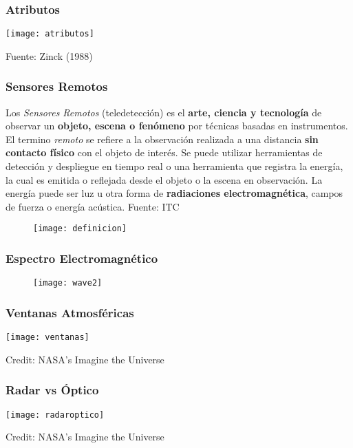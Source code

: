 \documentclass{beamer}
\begin{document}
\begin{frame}
\frametitle{Atributos}
\begin{center}
   	\texttt{[image: atributos]}
\end{center}
\tiny{Fuente: Zinck (1988)}
\end{frame}
\begin{frame}
\frametitle{Sensores Remotos}
\scriptsize {Los \emph{Sensores Remotos} (teledetección) es el \textbf{arte, ciencia y tecnología} de observar un \textbf{objeto, escena o fenómeno} por técnicas basadas en instrumentos. El termino \emph{remoto} se refiere a la observación realizada a una distancia \textbf{sin contacto físico} con el objeto de interés. Se puede utilizar herramientas de detección y despliegue en tiempo real o una herramienta que registra la energía, la cual es emitida o reflejada desde el objeto o la escena en observación. La energía puede ser luz u otra forma de \textbf{radiaciones electromagnética}, campos de fuerza o energía acústica.}
\tiny{Fuente: ITC} 
  \begin{figure}
    \centering
    \texttt{[image: definicion]}
   \end{figure}
\end{frame}
\begin{frame}
\frametitle{Espectro Electromagnético}
  \begin{figure}
    \centering
    \texttt{[image: wave2]}
  \end{figure}
\end{frame}
\begin{frame}
\frametitle{Ventanas Atmosféricas}
\begin{center} 
\texttt{[image: ventanas]}
\end{center}
\tiny{Credit: NASA's Imagine the Universe}
\end{frame}
\begin{frame}
\frametitle{Radar vs Óptico}
\begin{center} 
\texttt{[image: radaroptico]}
\end{center}
\tiny{Credit: NASA's Imagine the Universe}
\end{frame}
\end{document}
